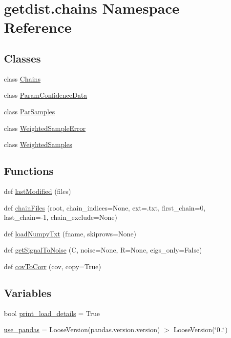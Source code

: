 \hypertarget{namespacegetdist_1_1chains}{}\section{getdist.\+chains Namespace Reference}
\label{namespacegetdist_1_1chains}
\subsection*{Classes}
\begin{DoxyCompactItemize}
\item 
class \mbox{\hyperlink{classgetdist_1_1chains_1_1Chains}{Chains}}
\item 
class \mbox{\hyperlink{classgetdist_1_1chains_1_1ParamConfidenceData}{Param\+Confidence\+Data}}
\item 
class \mbox{\hyperlink{classgetdist_1_1chains_1_1ParSamples}{Par\+Samples}}
\item 
class \mbox{\hyperlink{classgetdist_1_1chains_1_1WeightedSampleError}{Weighted\+Sample\+Error}}
\item 
class \mbox{\hyperlink{classgetdist_1_1chains_1_1WeightedSamples}{Weighted\+Samples}}
\end{DoxyCompactItemize}
\subsection*{Functions}
\begin{DoxyCompactItemize}
\item 
def \mbox{\hyperlink{namespacegetdist_1_1chains_a1ae5a71875f23ffd319d9920c10b8874}{last\+Modified}} (files)
\item 
def \mbox{\hyperlink{namespacegetdist_1_1chains_a4b7fca3560b676d80b95f038f023bde2}{chain\+Files}} (root, chain\+\_\+indices=None, ext=\textquotesingle{}.txt\textquotesingle{}, first\+\_\+chain=0, last\+\_\+chain=-\/1, chain\+\_\+exclude=None)
\item 
def \mbox{\hyperlink{namespacegetdist_1_1chains_a92803119cc9c25b30dfe65c226c9a2e9}{load\+Numpy\+Txt}} (fname, skiprows=None)
\item 
def \mbox{\hyperlink{namespacegetdist_1_1chains_a5e06cfdb8cb9fcc1c441388e98b667a1}{get\+Signal\+To\+Noise}} (C, noise=None, R=None, eigs\+\_\+only=False)
\item 
def \mbox{\hyperlink{namespacegetdist_1_1chains_ab06bc0bb109554727a57f915baa61c36}{cov\+To\+Corr}} (cov, copy=True)
\end{DoxyCompactItemize}
\subsection*{Variables}
\begin{DoxyCompactItemize}
\item 
bool \mbox{\hyperlink{namespacegetdist_1_1chains_af6c91c927222cf0ba828b416f0a3d197}{print\+\_\+load\+\_\+details}} = True
\item 
\mbox{\hyperlink{namespacegetdist_1_1chains_a9c008d8e20a771630b81660a71ccdb81}{use\+\_\+pandas}} = Loose\+Version(pandas.\+version.\+version) $>$ Loose\+Version(\char`\"{}0..\char`\"{})
\end{DoxyCompactItemize}


